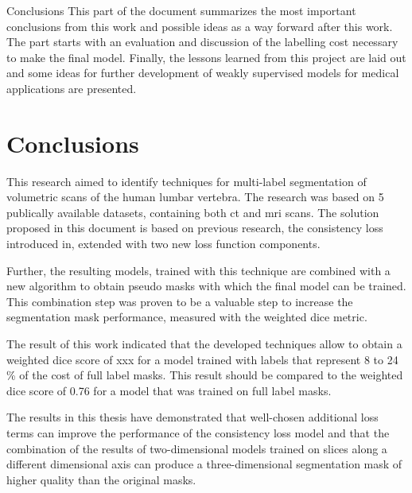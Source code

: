 \begin{partwithabstract}{Conclusions}
    This part of the document summarizes the most important conclusions from this work and possible ideas as a way forward after this work.
    The part starts with an evaluation and discussion of the labelling cost necessary to make the final model. 
    Finally, the lessons learned from this project are laid out and some ideas for further development of weakly supervised models for medical applications are presented. 
\end{partwithabstract}
\restoregeometry

\chapter{Conclusions}
\par{
    This research aimed to identify techniques for multi-label segmentation of volumetric scans of the human lumbar vertebra.
    The research was based on 5 publically available datasets, containing both \acrshort{ct} and \acrshort{mri} scans.
    The solution proposed in this document is based on previous research, the consistency loss introduced in\cite{Laradji2021}, extended with two new loss function components.  
}
\par{
    Further, the resulting models, trained with this technique are combined with a new algorithm to obtain pseudo masks with which the final model can be trained.
    This combination step was proven to be a valuable step to increase the segmentation mask performance, measured with the weighted dice metric.
}
\par{
    The result of this work indicated that the developed techniques allow to obtain a weighted dice score of xxx for a model trained with labels that represent 8 to 24 \% of the cost of full label masks.
    This result should be compared to the weighted dice score of 0.76 for a model that was trained on full label masks.
}
\par{
    The results in this thesis have demonstrated that well-chosen additional loss terms can improve the performance of the consistency loss model and 
    that the combination of the results of two-dimensional models trained on slices along a different dimensional axis can produce a three-dimensional segmentation mask of higher quality than the original masks.
}

